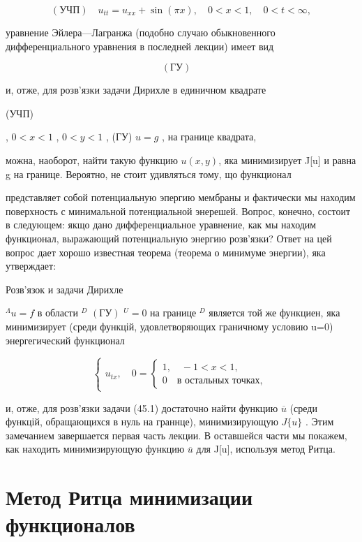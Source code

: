 \documentclass[
  ukrainian,
]{article}
\begin{document}
\[
(\text{УЧП}) \quad u_{tt} = u_{xx} + \sin(\pi x), \quad 0 < x < 1, \quad 0 < t < \infty,
\]

уравнение Эйлера---Лагранжа (подобно случаю обыкновенного
дифференциального уравнения в последней лекции) имеет вид

\[
(\text{ГУ}) \quad
\]

и, отже, для розв'язки задачи Дирихле в единичном квадрате

(УЧП)

, \(0 < x < 1\) , \(0 < y < 1\) , (ГУ) \(u = g\) , на границе квадрата,

можна, наоборот, найти такую функцию \(u(x, y)\), яка минимизирует
J{[}u{]} и равна g на границе. Вероятно, не стоит удивляться тому, що
функционал

представляет собой потенциальную эпергию мембраны и фактически мы
находим поверхность с минимальной потенциальной энерешей. Вопрос,
конечно, состоит в следующем: якщо дано дифференциальное уравнение, как
мы находим функционал, выражающий потенциальную энергию розв'язки? Ответ
на цей вопрос дает хорошо известная теорема (теорема о минимуме
энергии), яка утверждает:

Розв'язок и задачи Дирихле

\(^{\Lambda}u = f\) в области \(^{D}\) \((ГУ)\) \(^{U}=0\) на границе
\(^{D}\) является той же функциен, яка минимизирует (среди функцій,
удовлетворяющих граничному условию u=0) энергегический функционал

\[
\begin{cases} u_{tx}, \quad 0 = \begin{cases} 1, \quad -1 < x < 1, \\ 0 \quad \text{в остальных точках,} \end{cases} \end{cases}
\]

и, отже, для розв'язки задачи (45.1) достаточно найти функцию
\(\overline{u}\) (среди функцій, обращающихся в нуль на граннце),
минимизирующую \(J\{u\}\) . Этим замечанием завершается первая часть
лекции. В оставшейся части мы покажем, как находить минимизирующую
функцию \(\overline{u}\) для J{[}u{]}, используя метод Ритца.

\section{Метод Ритца минимизации
функционалов}\label{ux43cux435ux442ux43eux434-ux440ux438ux442ux446ux430-ux43cux438ux43dux438ux43cux438ux437ux430ux446ux438ux438-ux444ux443ux43dux43aux446ux438ux43eux43dux430ux43bux43eux432}
\end{document}
